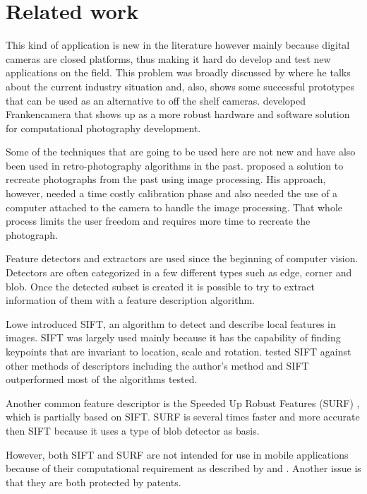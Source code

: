 \documentclass[12pt]{article}
\begin{document}
\section{Related work}
This kind of application is new in the literature however mainly because digital cameras are closed platforms, thus making it hard do develop and test new applications on the field. This problem was broadly discussed by \cite{Levoy10} where he talks about the current industry situation and, also, shows some successful prototypes that can be used as an alternative to off the shelf cameras. \cite{Adams:2010:FEP:1833349.1778766} developed Frankencamera that shows up as a more robust hardware and software solution for computational photography development.

Some of the techniques that are going to be used here are not new and have also been used in retro-photography algorithms in the past. \cite{Bae:2010:CR:1805964.1805968} proposed a solution to recreate photographs from the past using image processing. His approach, however, needed a time costly calibration phase and also needed the use of a computer attached to the camera to handle the image processing. That whole process limits the user freedom and requires more time to recreate the photograph. 

Feature detectors and extractors are used since the beginning of computer vision. Detectors are often categorized in a few different types such as edge, corner and blob. Once the detected subset is created it is possible to try to extract information of them with a feature description algorithm.

Lowe \cite{Lowe:99} introduced SIFT, an algorithm to detect and describe local features in images. SIFT was largely used mainly because it has the capability of finding keypoints that are invariant to location, scale and rotation. \cite{Mikolajczyk:05} tested SIFT against other methods of descriptors including the author's method and SIFT outperformed most of the algorithms tested.

Another common feature descriptor is the Speeded Up Robust Features (SURF) \cite{Bay:08}, which is partially based on SIFT. SURF is several times faster and more accurate then SIFT because it uses a type of blob detector as basis.

However, both SIFT and SURF are not intended for use in mobile applications because of their computational requirement as described by \cite{Rublee:11} and \cite{Yang:12}. Another issue is that they are both  protected by patents.
\end{document}
